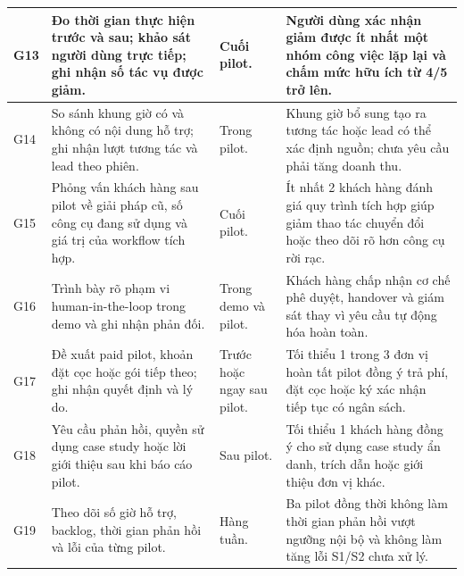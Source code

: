 \begin{longtable}{
    p{}
    p{}
    p{}
    p{}
}
    \hline

    G13
    &
    Đo thời gian thực hiện trước và sau; khảo sát người dùng trực tiếp; ghi nhận số tác vụ được giảm.
    &
    Cuối pilot.
    &
    Người dùng xác nhận giảm được ít nhất một nhóm công việc lặp lại và chấm mức hữu ích từ 4/5 trở lên. \\

    \hline

    G14
    &
    So sánh khung giờ có và không có nội dung hỗ trợ; ghi nhận lượt tương tác và lead theo phiên.
    &
    Trong pilot.
    &
    Khung giờ bổ sung tạo ra tương tác hoặc lead có thể xác định nguồn; chưa yêu cầu phải tăng doanh thu. \\

    \hline

    G15
    &
    Phỏng vấn khách hàng sau pilot về giải pháp cũ, số công cụ đang sử dụng và giá trị của workflow tích hợp.
    &
    Cuối pilot.
    &
    Ít nhất 2 khách hàng đánh giá quy trình tích hợp giúp giảm thao tác chuyển đổi hoặc theo dõi rõ hơn công cụ rời rạc. \\

    \hline

    G16
    &
    Trình bày rõ phạm vi human-in-the-loop trong demo và ghi nhận phản đối.
    &
    Trong demo và pilot.
    &
    Khách hàng chấp nhận cơ chế phê duyệt, handover và giám sát thay vì yêu cầu tự động hóa hoàn toàn. \\

    \hline

    G17
    &
    Đề xuất paid pilot, khoản đặt cọc hoặc gói tiếp theo; ghi nhận quyết định và lý do.
    &
    Trước hoặc ngay sau pilot.
    &
    Tối thiểu 1 trong 3 đơn vị hoàn tất pilot đồng ý trả phí, đặt cọc hoặc ký xác nhận tiếp tục có ngân sách. \\

    \hline

    G18
    &
    Yêu cầu phản hồi, quyền sử dụng case study hoặc lời giới thiệu sau khi báo cáo pilot.
    &
    Sau pilot.
    &
    Tối thiểu 1 khách hàng đồng ý cho sử dụng case study ẩn danh, trích dẫn hoặc giới thiệu đơn vị khác. \\

    \hline

    G19
    &
    Theo dõi số giờ hỗ trợ, backlog, thời gian phản hồi và lỗi của từng pilot.
    &
    Hàng tuần.
    &
    Ba pilot đồng thời không làm thời gian phản hồi vượt ngưỡng nội bộ và không làm tăng lỗi S1/S2 chưa xử lý. \\


\end{longtable}
